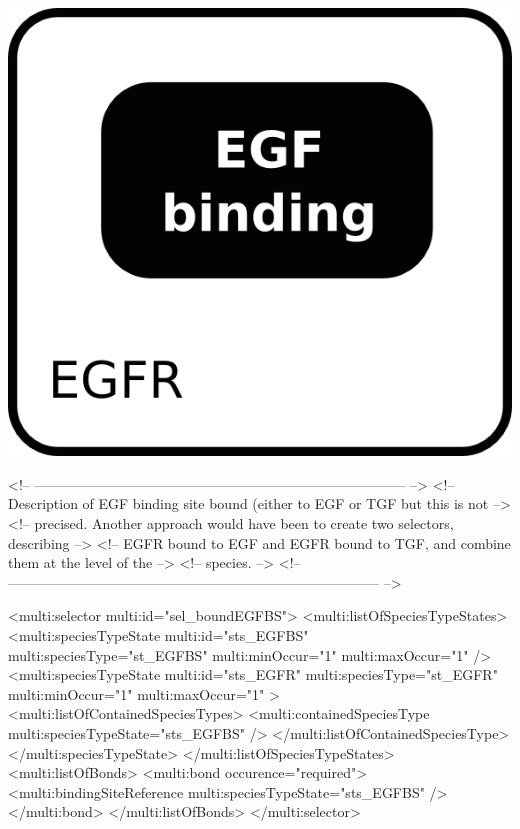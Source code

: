 \includegraphics{figs/pngs/sel_boundEGFBS.png}

\begin{example}
<!-- -------------------------------------------------------------------------------- -->
<!-- Description of EGF binding site bound (either to EGF or TGF but this is not      -->
<!-- precised. Another approach would have been to create two selectors, describing   -->
<!-- EGFR bound to EGF and EGFR bound to TGF, and combine them at the level of the    -->
<!-- species.                                                                         -->
<!-- -------------------------------------------------------------------------------- -->

      <multi:selector multi:id="sel_boundEGFBS">
        <multi:listOfSpeciesTypeStates>
          <multi:speciesTypeState multi:id="sts_EGFBS" multi:speciesType="st_EGFBS" 
                                   multi:minOccur="1" multi:maxOccur="1" />
          <multi:speciesTypeState multi:id="sts_EGFR" multi:speciesType="st_EGFR" 
                                   multi:minOccur="1" multi:maxOccur="1" >
            <multi:listOfContainedSpeciesTypes>
              <multi:containedSpeciesType multi:speciesTypeState="sts_EGFBS" /> 
            </multi:listOfContainedSpeciesType>          
          </multi:speciesTypeState>
        </multi:listOfSpeciesTypeStates>
        <multi:listOfBonds>
          <multi:bond occurence="required">
            <multi:bindingSiteReference multi:speciesTypeState="sts_EGFBS" />
          </multi:bond>
        </multi:listOfBonds>
      </multi:selector>
\end{example}


